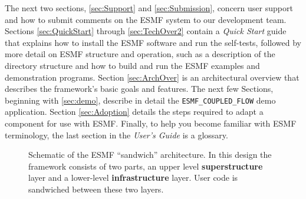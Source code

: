 The next two sections, \ref{sec:Support} and \ref{sec:Submission}, 
concern user support and how to submit comments on the ESMF system 
to our development team.  
Sections \ref{sec:QuickStart} through \ref{sec:TechOver2} contain a 
{\it Quick Start} guide that explains how to install the ESMF software 
and run the self-tests, 
followed by more detail on ESMF structure and operation, 
such as a description of the directory structure and how to build and
run the ESMF examples and demonstration programs.
Section \ref{sec:ArchOver} is an architectural overview that describes the
framework's basic goals and features.  The next few Sections, beginning
with \ref{sec:demo}, describe in detail the {\tt ESMF\_COUPLED\_FLOW} demo
application.
Section \ref{sec:Adoption} details the steps required to adapt a component
for use with ESMF.  Finally, to help you become familiar with ESMF
terminology, the last section in the {\it User's Guide} is a glossary.

\begin{center}
\begin{figure}
\caption{Schematic of the ESMF ``sandwich'' architecture. In this 
design the framework consists of two parts, an upper level
{\bf superstructure} layer and a lower-level {\bf infrastructure} layer. 
User code is sandwiched between these two layers.}
\label{fig:TheESMFwich}
\end{figure}
\end{center}


